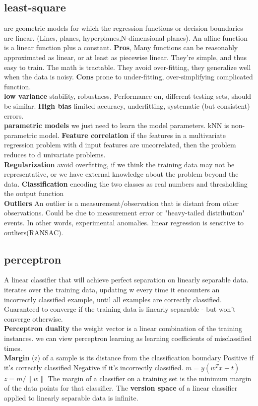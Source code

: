 \documentclass[cheatsheet.tex]{subfiles}
\begin{document}
\subsection{least-square}
are geometric models for which the regression functions or decision boundaries are linear. (Lines, planes, hyperplanes,N-dimensional planes). An affine function is a linear function plus a constant. 
\textbf{Pros}, Many functions can be reasonably approximated as linear, or at least as piecewise linear. They're simple, and thus easy to train. The math is tractable. They avoid over-fitting, they generalize well when the data is noisy. \textbf{Cons} prone to under-fitting, over-simplifying complicated function. 
\\
\textbf{low variance} stability, robustness, Performance on, different testing sets, should be similar. \textbf{High bias} limited accuracy, underfitting, systematic (but consistent) errors. 
\\
\textbf{parametric models} we just need to learn the model parameters. kNN is non-parametric model. \textbf{Feature correlation} if the features in a multivariate regression problem with d input features are uncorrelated, then the problem reduces to d univariate problems.
\\
\textbf{Regularization} avoid overfitting, if we think the training data may not be representative, or we have external knowledge about the problem beyond the data. \textbf{Classification} encoding the two classes as real numbers and thresholding the output function
\\
\textbf{Outliers} An outlier is a measurement/observation that is distant from other observations. Could be due to measurement error or "heavy-tailed distribution" events. In other words, experimental anomalies. linear regression is sensitive to outliers(RANSAC). 
\subsection{perceptron}
A linear classifier that will achieve perfect separation on linearly separable data. iterates over the training data, updating w every time it encounters an incorrectly classified example, until all examples are correctly classified. Guaranteed to converge if the training
data is linearly separable - but won't converge otherwise. 
\\
\textbf{Perceptron duality} the weight vector is a linear combination of the training instances. we can view perceptron learning as learning coefficients of misclassified times. 
\\
\textbf{Margin} (z) of a sample is its distance from the classification boundary \textbullet Positive if it's correctly classified \textbullet Negative if it's incorrectly classified. $m=y(w^Tx-t)$  $z=m/\|w\|$ The margin of a classifier on a training set is the minimum margin of the data points for that classifier. The \textbf{version space} of a linear classifier applied to linearly separable data is infinite. 
\end{document}
